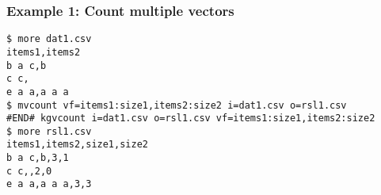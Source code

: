 \subsubsection*{Example 1: Count multiple vectors}



\begin{Verbatim}[baselinestretch=0.7,frame=single]
$ more dat1.csv
items1,items2
b a c,b
c c,
e a a,a a a
$ mvcount vf=items1:size1,items2:size2 i=dat1.csv o=rsl1.csv
#END# kgvcount i=dat1.csv o=rsl1.csv vf=items1:size1,items2:size2
$ more rsl1.csv
items1,items2,size1,size2
b a c,b,3,1
c c,,2,0
e a a,a a a,3,3
\end{Verbatim}
